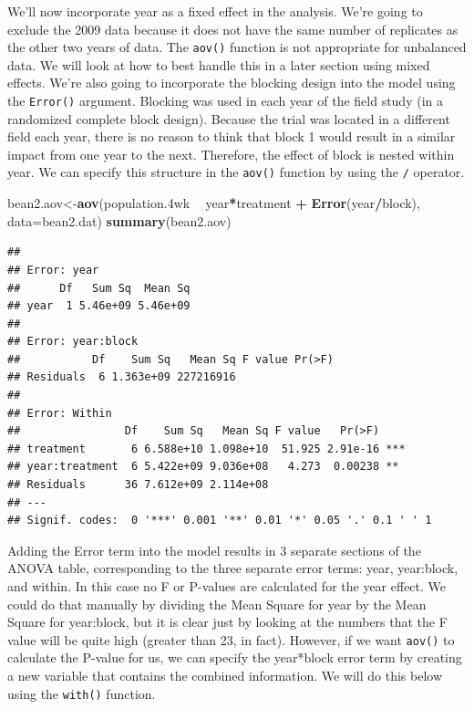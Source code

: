 \documentclass[letterpaper,]{book}
\newenvironment{Shaded}{\begin{snugshade}}{\end{snugshade}}
\newcommand{\DataTypeTok}[1]{\textcolor[rgb]{0.13,0.29,0.53}{#1}}
\newcommand{\FloatTok}[1]{\textcolor[rgb]{0.00,0.00,0.81}{#1}}
\newcommand{\KeywordTok}[1]{\textcolor[rgb]{0.13,0.29,0.53}{\textbf{#1}}}
\newcommand{\NormalTok}[1]{#1}
\newcommand{\OperatorTok}[1]{\textcolor[rgb]{0.81,0.36,0.00}{\textbf{#1}}}
\newcommand{\StringTok}[1]{\textcolor[rgb]{0.31,0.60,0.02}{#1}}
\begin{document}
We'll now incorporate year as a fixed effect in the analysis. We're going to exclude the 2009 data because it does not have the same number of replicates as the other two years of data. The \texttt{aov()} function is not appropriate for unbalanced data. We will look at how to best handle this in a later section using mixed effects. We're also going to incorporate the blocking design into the model using the \texttt{Error()} argument. Blocking was used in each year of the field study (in a randomized complete block design). Because the trial was located in a different field each year, there is no reason to think that block 1 would result in a similar impact from one year to the next. Therefore, the effect of block is nested within year. We can specify this structure in the \texttt{aov()} function by using the \texttt{/} operator.

\begin{Shaded}
\begin{Highlighting}[]
\NormalTok{bean2.aov<-}\KeywordTok{aov}\NormalTok{(population}\FloatTok{.4}\NormalTok{wk }\OperatorTok{~}\StringTok{ }\NormalTok{year}\OperatorTok{*}\NormalTok{treatment }\OperatorTok{+}\StringTok{ }\KeywordTok{Error}\NormalTok{(year}\OperatorTok{/}\NormalTok{block), }
               \DataTypeTok{data=}\NormalTok{bean2.dat)}
\KeywordTok{summary}\NormalTok{(bean2.aov)}
\end{Highlighting}
\end{Shaded}

\begin{verbatim}
## 
## Error: year
##      Df   Sum Sq  Mean Sq
## year  1 5.46e+09 5.46e+09
## 
## Error: year:block
##           Df    Sum Sq   Mean Sq F value Pr(>F)
## Residuals  6 1.363e+09 227216916               
## 
## Error: Within
##                Df    Sum Sq   Mean Sq F value   Pr(>F)    
## treatment       6 6.588e+10 1.098e+10  51.925 2.91e-16 ***
## year:treatment  6 5.422e+09 9.036e+08   4.273  0.00238 ** 
## Residuals      36 7.612e+09 2.114e+08                     
## ---
## Signif. codes:  0 '***' 0.001 '**' 0.01 '*' 0.05 '.' 0.1 ' ' 1
\end{verbatim}

Adding the Error term into the model results in 3 separate sections of the ANOVA table, corresponding to the three separate error terms: year, year:block, and within. In this case no F or P-values are calculated for the year effect. We could do that manually by dividing the Mean Square for year by the Mean Square for year:block, but it is clear just by looking at the numbers that the F value will be quite high (greater than 23, in fact). However, if we want \texttt{aov()} to calculate the P-value for us, we can specify the year*block error term by creating a new variable that contains the combined information. We will do this below using the \texttt{with()} function.
\end{document}
